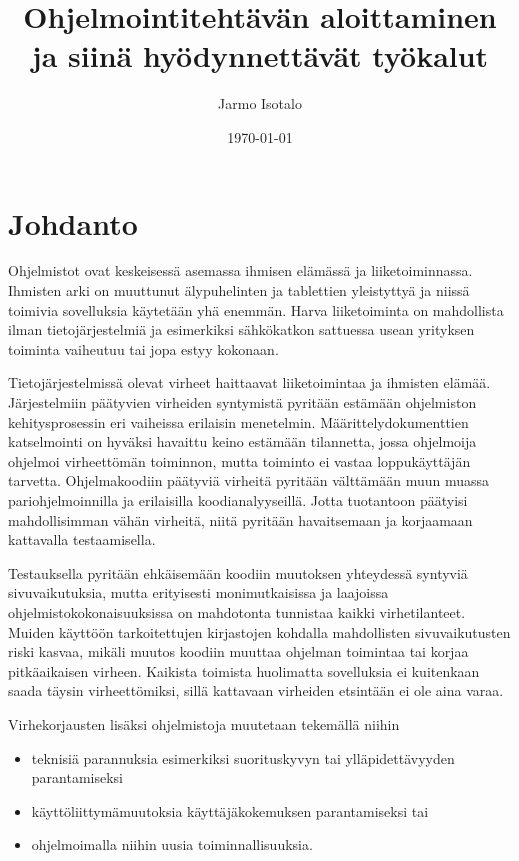 \documentclass[finnish]{tktltiki2}
\title{Ohjelmointitehtävän aloittaminen ja siinä hyödynnettävät työkalut}
\author{Jarmo Isotalo}
\date{\today}
\theoremstyle{definition}
\theoremstyle{remark}
\begin{document}

\frontmatter      %

\maketitle        %
\makeabstract     %

\tableofcontents  %


\mainmatter       %

\section{Johdanto}

Ohjelmistot ovat keskeisessä asemassa ihmisen elämässä ja liiketoiminnassa. Ihmisten arki on muuttunut älypuhelinten ja tablettien yleistyttyä ja niissä toimivia sovelluksia käytetään yhä enemmän. Harva liiketoiminta on mahdollista ilman tietojärjestelmiä ja esimerkiksi sähkökatkon sattuessa usean yrityksen toiminta vaiheutuu tai jopa estyy kokonaan.

Tietojärjestelmissä olevat virheet haittaavat liiketoimintaa ja ihmisten elämää. Järjestelmiin päätyvien virheiden syntymistä pyritään estämään ohjelmiston kehitysprosessin eri vaiheissa erilaisin menetelmin. Määrittelydokumenttien katselmointi on hyväksi havaittu keino estämään tilannetta, jossa ohjelmoija ohjelmoi virheettömän toiminnon, mutta toiminto ei vastaa loppukäyttäjän tarvetta. Ohjelmakoodiin päätyviä virheitä pyritään välttämään muun muassa pariohjelmoinnilla ja erilaisilla koodianalyyseillä. Jotta tuotantoon päätyisi mahdollisimman vähän virheitä, niitä pyritään havaitsemaan ja korjaamaan kattavalla testaamisella.

Testauksella pyritään ehkäisemään koodiin muutoksen yhteydessä syntyviä sivuvaikutuksia, mutta erityisesti monimutkaisissa ja laajoissa ohjelmistokokonaisuuksissa on mahdotonta tunnistaa kaikki virhetilanteet. Muiden käyttöön tarkoitettujen kirjastojen kohdalla mahdollisten sivuvaikutusten riski kasvaa, mikäli muutos koodiin muuttaa ohjelman toimintaa tai korjaa pitkäaikaisen virheen. Kaikista toimista huolimatta sovelluksia ei kuitenkaan saada täysin virheettömiksi, sillä kattavaan virheiden etsintään ei ole aina varaa.

Virhekorjausten lisäksi ohjelmistoja muutetaan tekemällä niihin
\begin{itemize}
  \item teknisiä parannuksia esimerkiksi suorituskyvyn tai ylläpidettävyyden parantamiseksi
  \item käyttöliittymämuutoksia käyttäjäkokemuksen parantamiseksi tai
  \item ohjelmoimalla niihin uusia toiminnallisuuksia.
\end{itemize}
\end{document}
